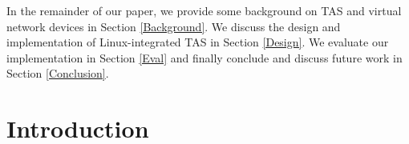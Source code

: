 In the remainder of our paper, we provide some background on TAS and virtual
network devices in Section \ref{Background}. We discuss the design and
implementation of Linux-integrated TAS in Section \ref{Design}. We evaluate
our implementation in Section \ref{Eval} and finally conclude and discuss
future work in Section \ref{Conclusion}.\section{Introduction}